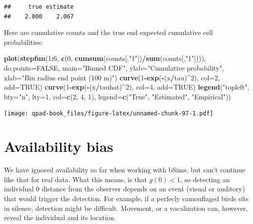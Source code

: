 \documentclass[12pt,]{book}
\newenvironment{Shaded}{\begin{snugshade}}{\end{snugshade}}
\newcommand{\DataTypeTok}[1]{\textcolor[rgb]{0.13,0.29,0.53}{#1}}
\newcommand{\DecValTok}[1]{\textcolor[rgb]{0.00,0.00,0.81}{#1}}
\newcommand{\KeywordTok}[1]{\textcolor[rgb]{0.13,0.29,0.53}{\textbf{#1}}}
\newcommand{\NormalTok}[1]{#1}
\newcommand{\OperatorTok}[1]{\textcolor[rgb]{0.81,0.36,0.00}{\textbf{#1}}}
\newcommand{\OtherTok}[1]{\textcolor[rgb]{0.56,0.35,0.01}{#1}}
\newcommand{\StringTok}[1]{\textcolor[rgb]{0.31,0.60,0.02}{#1}}
\begin{document}
\begin{verbatim}
##     true estimate 
##    2.000    2.067
\end{verbatim}

Here are cumulative counts and the true end expected
cumulative cell probabilities:

\begin{Shaded}
\begin{Highlighting}[]
\KeywordTok{plot}\NormalTok{(}\KeywordTok{stepfun}\NormalTok{(}\DecValTok{1}\OperatorTok{:}\DecValTok{6}\NormalTok{, }\KeywordTok{c}\NormalTok{(}\DecValTok{0}\NormalTok{, }\KeywordTok{cumsum}\NormalTok{(counts[,}\StringTok{"1"}\NormalTok{])}\OperatorTok{/}\KeywordTok{sum}\NormalTok{(counts[,}\StringTok{"1"}\NormalTok{]))), }
  \DataTypeTok{do.points=}\OtherTok{FALSE}\NormalTok{, }\DataTypeTok{main=}\StringTok{"Binned CDF"}\NormalTok{,}
  \DataTypeTok{ylab=}\StringTok{"Cumulative probability"}\NormalTok{, }
  \DataTypeTok{xlab=}\StringTok{"Bin radius end point (100 m)"}\NormalTok{)}
\KeywordTok{curve}\NormalTok{(}\DecValTok{1}\OperatorTok{-}\KeywordTok{exp}\NormalTok{(}\OperatorTok{-}\NormalTok{(x}\OperatorTok{/}\NormalTok{tau)}\OperatorTok{^}\DecValTok{2}\NormalTok{), }\DataTypeTok{col=}\DecValTok{2}\NormalTok{, }\DataTypeTok{add=}\OtherTok{TRUE}\NormalTok{)}
\KeywordTok{curve}\NormalTok{(}\DecValTok{1}\OperatorTok{-}\KeywordTok{exp}\NormalTok{(}\OperatorTok{-}\NormalTok{(x}\OperatorTok{/}\NormalTok{tauhat)}\OperatorTok{^}\DecValTok{2}\NormalTok{), }\DataTypeTok{col=}\DecValTok{4}\NormalTok{, }\DataTypeTok{add=}\OtherTok{TRUE}\NormalTok{)}
\KeywordTok{legend}\NormalTok{(}\StringTok{"topleft"}\NormalTok{, }\DataTypeTok{bty=}\StringTok{"n"}\NormalTok{, }\DataTypeTok{lty=}\DecValTok{1}\NormalTok{, }\DataTypeTok{col=}\KeywordTok{c}\NormalTok{(}\DecValTok{2}\NormalTok{, }\DecValTok{4}\NormalTok{, }\DecValTok{1}\NormalTok{), }
  \DataTypeTok{legend=}\KeywordTok{c}\NormalTok{(}\StringTok{"True"}\NormalTok{, }\StringTok{"Estimated"}\NormalTok{, }\StringTok{"Empirical"}\NormalTok{))}
\end{Highlighting}
\end{Shaded}

\texttt{[image: qpad-book\_files/figure-latex/unnamed-chunk-97-1.pdf]}

\hypertarget{availability-bias}{%
\section{Availability bias}\label{availability-bias}}

We have ignored availability so far when working with bSims,
but can't continue like that for real data.
What this means, is that \(g(0) < 1\), so detecting
an individual 0 distance from the observer depends on
an event (visual or auditory) that would trigger the detection.
For example, if a perfecly camouflaged birds sits in silence,
detection might be difficult. Movement, or a vocalization
can, however, reveal the individual and its location.
\end{document}
